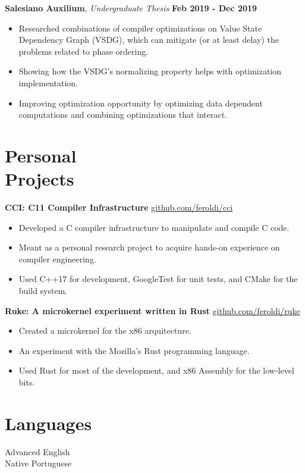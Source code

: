 \documentclass[margin,line]{resume}
\begin{document}
\begin{resume}
    \textbf{Salesiano Auxilium}, \textsl{Undergraduate Thesis} \hfill \textbf{Feb 2019 - Dec 2019}
    \begin{itemize}
        \item Researched combinations of compiler optimizations on Value State Dependency Graph (VSDG), which can mitigate (or at least delay) the problems related to phase ordering.
        \item Showing how the VSDG's normalizing property helps with optimization implementation.
        \item Improving optimization opportunity by optimizing data dependent computations and combining optimizations that interact.
    \end{itemize}

    \section{\mysidestyle Personal\\Projects}

    \textbf{CCI: C11 Compiler Infrastructure} \hfill \url{github.com/feroldi/cci}
    \begin{itemize}
        \item Developed a C compiler infrastructure to manipulate and compile C code.
        \item Meant as a personal research project to acquire hands-on experience on compiler engineering.
        \item Used C++17 for development, GoogleTest for unit tests, and CMake for the build system.
    \end{itemize}

    \textbf{Ruke: A microkernel experiment written in Rust} \hfill \url{github.com/feroldi/ruke}
    \begin{itemize}
        \item Created a microkernel for the x86 arquitecture.
        \item An experiment with the Mozilla's Rust programming language.
        \item Used Rust for most of the development, and x86 Assembly for the low-level bits.
    \end{itemize}

    \section{\mysidestyle Languages}

    Advanced English\\
    Native Portuguese


\end{resume}
\end{document}
